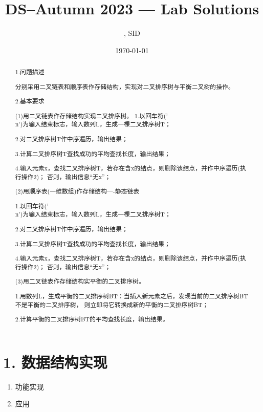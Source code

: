 \documentclass[UTF8]{ctexart}
\title{DS--Autumn 2023 --- Lab \Lab    Solutions} %
\author{\Name, SID \SID} %
\date{\today} %
\newenvironment{qparts}{\begin{enumerate}[{(}a{)}]}{\end{enumerate}} %
\begin{document}
\maketitle


\begin{abstract}
    1.问题描述
    
    分别采用二叉链表和顺序表作存储结构，实现对二叉排序树与平衡二叉树的操作。

    2.基本要求

    (1)用二叉链表作存储结构实现二叉排序树。
        1.以回车符('\\n')为输入结束标志，输入数列L，生成一棵二叉排序树T；

        2.对二叉排序树T作中序遍历，输出结果；

        3.计算二叉排序树T查找成功的平均查找长度，输出结果；

        4.输入元素x，查找二叉排序树T，若存在含x的结点，则删除该结点，并作中序遍历(执行操作2)；
        否则，输出信息“无x”；

    (2)用顺序表(一维数组)作存储结构----静态链表

        1.以回车符('\\n')为输入结束标志，输入数列L，生成一棵二叉排序树T；

        2.对二叉排序树T作中序遍历，输出结果；

        3.计算二叉排序树T查找成功的平均查找长度，输出结果；

        4.输入元素x，查找二叉排序树T，若存在含x的结点，则删除该结点，并作中序遍历(执行操作2)；
        否则，输出信息“无x”；

    (3)用二叉链表作存储结构实平衡的二叉排序树。

        1.用数列L，生成平衡的二叉排序树BT：当插入新元素之后，发现当前的二叉排序树BT不是平衡的二叉排序树，
        则立即将它转换成新的平衡的二叉排序树BT；

        2.计算平衡的二叉排序树BT的平均查找长度，输出结果。







\end{abstract}







\section*{1. 数据结构实现}
\begin{qparts}
    \item 功能实现


    \item 应用 
    
\end{qparts}
\end{document}
